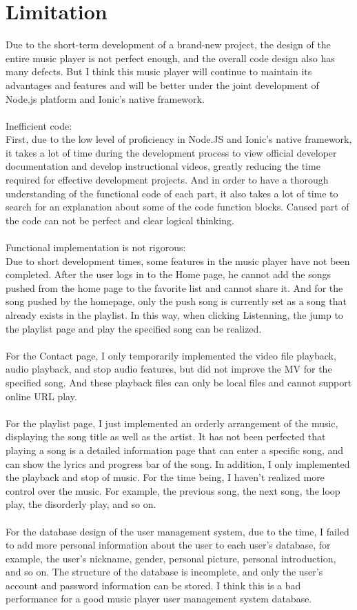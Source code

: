 \section{Limitation}
Due to the short-term development of a brand-new project, the design of the entire music player is not perfect enough, and the overall code design also has many defects. But I think this music player will continue to maintain its advantages and features and will be better under the joint development of Node.js platform and Ionic's native framework. \\ \\
Inefficient code: \\
First, due to the low level of proficiency in Node.JS and Ionic's native framework, it takes a lot of time during the development process to view official developer documentation and develop instructional videos, greatly reducing the time required for effective development projects. And in order to have a thorough understanding of the functional code of each part, it also takes a lot of time to search for an explanation about some of the code function blocks. Caused part of the code can not be perfect and clear logical thinking. \\ \\
Functional implementation is not rigorous: \\
Due to short development times, some features in the music player have not been completed. After the user logs in to the Home page, he cannot add the songs pushed from the home page to the favorite list and cannot share it. And for the song pushed by the homepage, only the push song is currently set as a song that already exists in the playlist. In this way, when clicking Listenning, the jump to the playlist page and play the specified song can be realized. \\ \\ For the Contact page, I only temporarily implemented the video file playback, audio playback, and stop audio features, but did not improve the MV for the specified song. And these playback files can only be local files and cannot support online URL play. \\ \\ 
For the playlist page, I just implemented an orderly arrangement of the music, displaying the song title as well as the artist. It has not been perfected that playing a song is a detailed information page that can enter a specific song, and can show the lyrics and progress bar of the song. In addition, I only implemented the playback and stop of music. For the time being, I haven't realized more control over the music. For example, the previous song, the next song, the loop play, the disorderly play, and so on. \\ \\ 
For the database design of the user management system, due to the time, I failed to add more personal information about the user to each user's database, for example, the user's nickname, gender, personal picture, personal introduction, and so on. The structure of the database is incomplete, and only the user's account and password information can be stored. I think this is a bad performance for a good music player user management system database.
